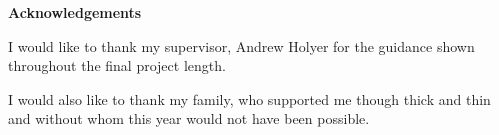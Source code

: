 \mbox{}\newline\vspace{10mm} \mbox{}\LARGE
%
{\bf Acknowledgements} \normalsize \vspace{5mm}

I would like to thank my supervisor, Andrew Holyer for the guidance shown throughout the final project length.

I would also like to thank my family, who supported me though thick and thin and without whom this year would not have been possible.
